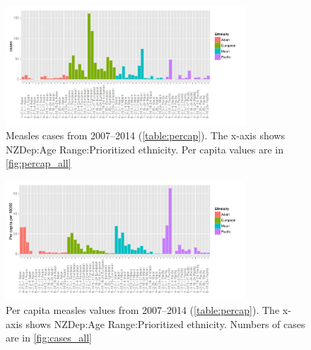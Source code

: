 \documentclass{article}
\begin{document}
\begin{figure}
\begin{center}
     \includegraphics[width=0.8\textwidth]{case_ordert.pdf}
\end{center}
\caption{Measles cases from 2007--2014 (\autoref{table:percap}). The x-axis shows NZDep:Age Range:Prioritized ethnicity. Per capita values are in \autoref{fig:percap_all}}
\label{fig:cases_all}
\end{figure}

\begin{figure}
\begin{center}
     \includegraphics[width=0.8\textwidth]{percap_ordert.pdf}
\end{center}
\caption{Per capita measles values from 2007--2014 (\autoref{table:percap}). The x-axis shows NZDep:Age Range:Prioritized ethnicity. Numbers of cases are in \autoref{fig:cases_all}}
\label{fig:percap_all}
\end{figure}
\end{document}
